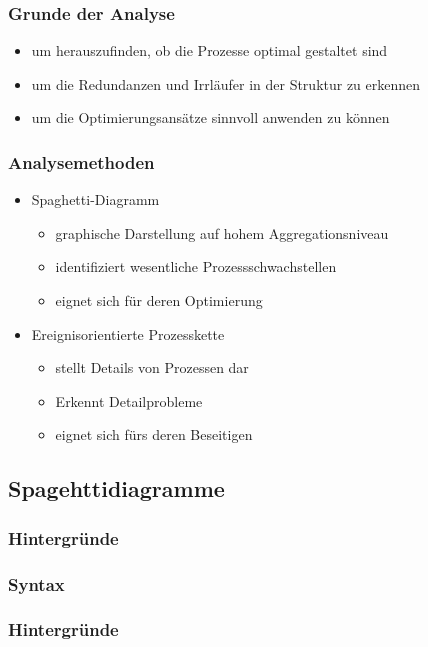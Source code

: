 \documentclass{beamer}
\begin{document}
  \begin{frame}
    \frametitle{Grunde der Analyse}
   \begin{itemize}
      \item um herauszufinden, ob die Prozesse optimal gestaltet sind
      \item um die Redundanzen und Irrläufer in der Struktur zu erkennen
      \item um die Optimierungsansätze sinnvoll anwenden zu können
    \end{itemize}
  \end{frame}


 \begin{frame}
  \frametitle{Analysemethoden}

  \begin{itemize}
   \item Spaghetti-Diagramm
   \begin{itemize}
    \item graphische Darstellung auf hohem Aggregationsniveau
    \item identifiziert wesentliche Prozessschwachstellen
    \item eignet sich für deren Optimierung
   \end{itemize}
   \bigskip
    \item Ereignisorientierte Prozesskette
    \begin{itemize}
    \item stellt Details von Prozessen dar
    \item Erkennt Detailprobleme
    \item eignet sich fürs deren Beseitigen
   \end{itemize}

  \end{itemize}


 \end{frame}

 \subsection[Spaghettidiagramme]{Spagehttidiagramme}
 \begin{frame}
  \frametitle{Hintergründe}

 \end{frame}

 \subsubsection[Syntax]{Syntax}
 \begin{frame}
  \frametitle{Hintergründe}

 \end{frame}
\end{document}
